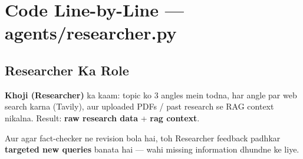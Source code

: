 \documentclass[11pt, a4paper]{article}
\begin{document}
\newpage

\section{Code Line-by-Line --- agents/researcher.py}

\subsection{Researcher Ka Role}

\begin{storybox}
\textbf{Khoji (Researcher)} ka kaam: topic ko 3 angles mein todna, har angle par web search karna (Tavily), aur uploaded PDFs / past research se RAG context nikalna. Result: \textbf{raw research data} + \textbf{rag context}.

Aur agar fact-checker ne revision bola hai, toh Researcher feedback padhkar \textbf{targeted new queries} banata hai --- wahi missing information dhundne ke liye.
\end{storybox}
\end{document}
